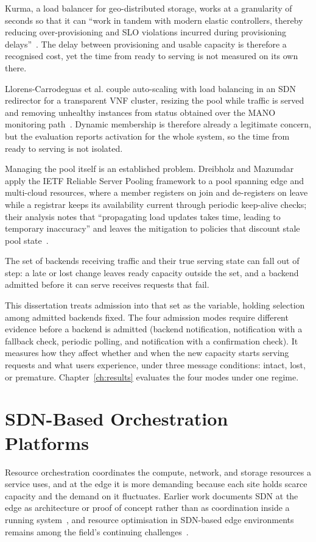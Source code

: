 ﻿\documentclass[12pt,reqno,twoside]{amsbook}
\begin{document}
Kurma, a load balancer for geo-distributed storage, works at a granularity of
seconds so that it can \enquote{work in tandem with modern elastic controllers,
thereby reducing over-provisioning and SLO violations incurred during
provisioning delays}~\parencite[p.~386]{Bogdanov2018Kurma}. The delay between
provisioning and usable capacity is therefore a recognised cost, yet the time
from ready to serving is not measured on its own there.

Llorens-Carrodeguas et al. couple auto-scaling with load balancing in an SDN
redirector for a transparent VNF cluster, resizing the pool while traffic is
served and removing unhealthy instances from status obtained over the MANO
monitoring
path~\parencite{Llorens2021SDNBasedHorizontalAutoScalingLoadBalancing}. Dynamic
membership is therefore already a legitimate concern, but the evaluation reports
activation for the whole system, so the time from ready to serving is not
isolated.

Managing the pool itself is an established problem. Dreibholz and Mazumdar
apply the IETF Reliable Server Pooling framework to a pool spanning edge and
multi-cloud resources, where a member registers on join and de-registers on
leave while a registrar keeps its availability current through periodic
keep-alive checks; their analysis notes that \enquote{propagating load updates
takes time, leading to temporary inaccuracy} and leaves the mitigation to
policies that discount stale pool
state~\parencite[p.~6]{Dreibholz2023TowardsLightweightTaskSchedulingFramework}.

The set of backends receiving traffic and their true serving state can fall out
of step: a late or lost change leaves ready capacity outside the set, and a
backend admitted before it can serve receives requests that fail.

This dissertation treats admission into that set as the variable, holding
selection among admitted backends fixed. The four admission modes require
different evidence before a backend is admitted (backend notification,
notification with a fallback check, periodic polling, and notification with a
confirmation check). It measures how they affect whether and
when the new capacity starts serving requests and what users experience, under
three message conditions: intact, lost, or premature.
Chapter~\ref{ch:results} evaluates the four modes under one regime.

\section{SDN-Based Orchestration Platforms}\label{sec:lit_sdn_orchestration} %
Resource orchestration coordinates the compute, network, and storage resources a
service uses, and at the edge it is more demanding because each site holds scarce
capacity and the demand on it fluctuates. Earlier work documents SDN at the edge
as architecture or proof of concept rather than as coordination inside a running
system~\parencite{Baktir2017HowCanEdgeComputingBenefit,Wang2019SoftwareDefinedNetworkingEnhancedEdge,Peng2019SDNResourceManagementAutonomousVehicular},
and resource optimisation in SDN-based edge environments remains among the field's
continuing challenges~\parencite{Nain2024ResourceOptimizationEdgeSDNEdge}.
\end{document}

